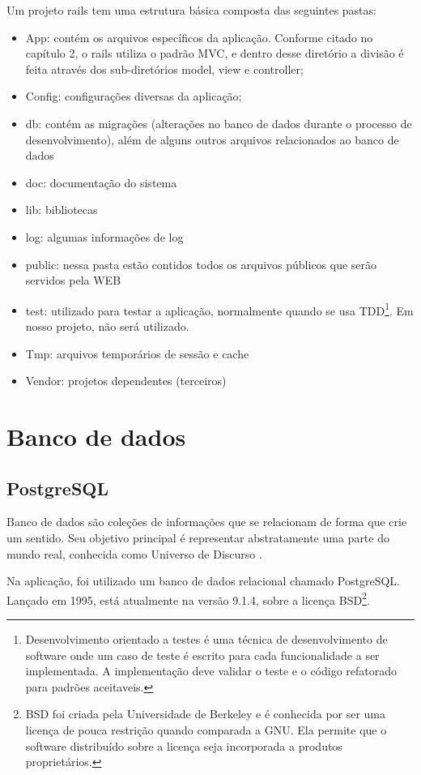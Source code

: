      
            Um projeto rails tem uma estrutura básica composta das seguintes pastas:
\begin{itemize}
\item App: contém os arquivos específicos da aplicação. Conforme citado no capítulo 2, o rails utiliza o padrão \ac{MVC}, e dentro desse diretório a divisão é feita através dos sub-diretórios model, view e controller;
\item Config: configurações diversas da aplicação;
\item db: contém as migrações (alterações no banco de dados durante o processo de desenvolvimento), além de alguns outros arquivos relacionados ao banco de dados
\item doc: documentação do sistema
\item lib: bibliotecas
\item log: algumas informações de log
\item public: nessa pasta estão contidos todos os arquivos públicos que serão servidos pela WEB
\item test: utilizado para testar a aplicação, normalmente quando se usa \ac{TDD}\footnote{Desenvolvimento orientado a testes é uma técnica de desenvolvimento de software onde um caso de teste é escrito para cada funcionalidade a ser implementada. A implementação deve validar o teste e o código refatorado para padrões aceitaveis.}. Em nosso projeto, não será utilizado.
\item Tmp: arquivos temporários de sessão e cache
\item Vendor: projetos dependentes (terceiros)
\end{itemize}     
     
    \section{Banco de dados}
    \subsection{PostgreSQL}
            Banco de dados são coleções de informações que se relacionam de forma que crie um sentido. Seu objetivo principal é representar abstratamente uma parte do mundo real, conhecida como Universo de Discurso \cite{ufmsbd}. 
			
    Na aplicação, foi utilizado um banco de dados relacional chamado PostgreSQL. Lançado em 1995, está atualmente na versão 9.1.4, sobre a licença BSD\footnote{BSD foi criada pela Universidade de Berkeley e é conhecida por ser uma licença de pouca restrição quando comparada a GNU. Ela permite que o software distribuído sobre a licença seja incorporada a produtos proprietários.}.
	
